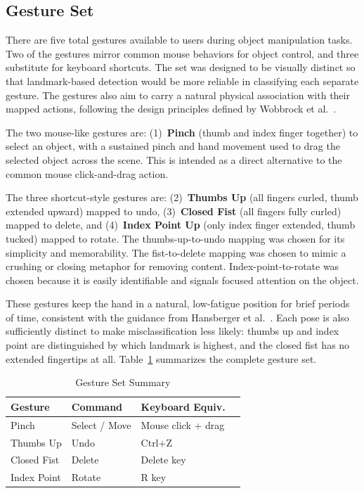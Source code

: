 \documentclass[manuscript]{acmart}
\begin{document}
\subsection{Gesture Set}

There are five total gestures available to users during object manipulation tasks. Two of the gestures mirror common mouse behaviors for object control, and three substitute for keyboard shortcuts. The set was designed to be visually distinct so that landmark-based detection would be more reliable in classifying each separate gesture. The gestures also aim to carry a natural physical association with their mapped actions, following the design principles defined by Wobbrock et al.~\cite{wobbrock2009}.

The two mouse-like gestures are: (1)~\textbf{Pinch} (thumb and index finger together) to select an object, with a sustained pinch and hand movement used to drag the selected object across the scene. This is intended as a direct alternative to the common mouse click-and-drag action.

The three shortcut-style gestures are: (2)~\textbf{Thumbs Up} (all fingers curled, thumb extended upward) mapped to undo, (3)~\textbf{Closed Fist} (all fingers fully curled) mapped to delete, and (4)~\textbf{Index Point Up} (only index finger extended, thumb tucked) mapped to rotate. The thumbs-up-to-undo mapping was chosen for its simplicity and memorability. The fist-to-delete mapping was chosen to mimic a crushing or closing metaphor for removing content. Index-point-to-rotate was chosen because it is easily identifiable and signals focused attention on the object.

These gestures keep the hand in a natural, low-fatigue position for brief periods of time, consistent with the guidance from Hansberger et al.~\cite{hansberger2017}. Each pose is also sufficiently distinct to make misclassification less likely: thumbs up and index point are distinguished by which landmark is highest, and the closed fist has no extended fingertips at all. Table~\ref{tab:gestures} summarizes the complete gesture set.

\begin{table}
  \caption{Gesture Set Summary}
  \label{tab:gestures}
  \begin{tabular}{llll}
    \toprule
    Gesture & Command & Keyboard Equiv. \\
    \midrule
    Pinch          & Select / Move    & Mouse click + drag \\
    Thumbs Up      & Undo             & Ctrl+Z \\
    Closed Fist    & Delete           & Delete key \\
    Index Point    & Rotate           & R key \\
    \bottomrule
  \end{tabular}
\end{table}
\end{document}
